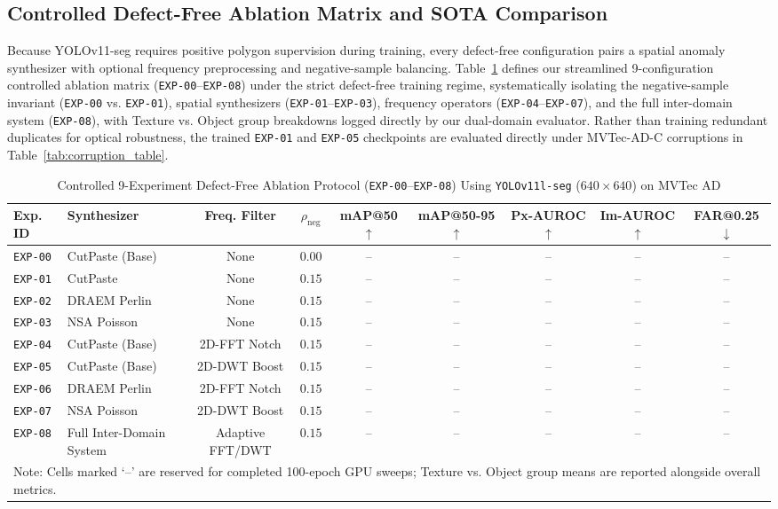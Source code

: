 \subsection{Controlled Defect-Free Ablation Matrix and SOTA Comparison}
Because YOLOv11-seg requires positive polygon supervision during training, every defect-free configuration pairs a spatial anomaly synthesizer with optional frequency preprocessing and negative-sample balancing. Table~\ref{tab:ablation_results} defines our streamlined 9-configuration controlled ablation matrix (\texttt{EXP-00}--\texttt{EXP-08}) under the strict defect-free training regime, systematically isolating the negative-sample invariant (\texttt{EXP-00} vs. \texttt{EXP-01}), spatial synthesizers (\texttt{EXP-01}--\texttt{EXP-03}), frequency operators (\texttt{EXP-04}--\texttt{EXP-07}), and the full inter-domain system (\texttt{EXP-08}), with Texture vs. Object group breakdowns logged directly by our dual-domain evaluator. Rather than training redundant duplicates for optical robustness, the trained \texttt{EXP-01} and \texttt{EXP-05} checkpoints are evaluated directly under MVTec-AD-C corruptions in Table~\ref{tab:corruption_table}.

\begin{table}[t]
\centering
\caption{Controlled 9-Experiment Defect-Free Ablation Protocol (\texttt{EXP-00}--\texttt{EXP-08}) Using \texttt{YOLOv11l-seg} ($640\times 640$) on MVTec AD}
\label{tab:ablation_results}
\setlength{\tabcolsep}{5pt}
\begin{tabular}{l l c c c c c c c}
\toprule
\textbf{Exp. ID} & \textbf{Synthesizer} & \textbf{Freq. Filter} & \textbf{$\rho_{\text{neg}}$} & \textbf{mAP@50} $\uparrow$ & \textbf{mAP@50-95} $\uparrow$ & \textbf{Px-AUROC} $\uparrow$ & \textbf{Im-AUROC} $\uparrow$ & \textbf{FAR@0.25} $\downarrow$ \\
\midrule
\texttt{EXP-00} & CutPaste (Base) & None & $0.00$ & -- & -- & -- & -- & -- \\
\texttt{EXP-01} & CutPaste & None & $0.15$ & -- & -- & -- & -- & -- \\
\texttt{EXP-02} & DRAEM Perlin & None & $0.15$ & -- & -- & -- & -- & -- \\
\texttt{EXP-03} & NSA Poisson & None & $0.15$ & -- & -- & -- & -- & -- \\
\texttt{EXP-04} & CutPaste (Base) & 2D-FFT Notch & $0.15$ & -- & -- & -- & -- & -- \\
\texttt{EXP-05} & CutPaste (Base) & 2D-DWT Boost & $0.15$ & -- & -- & -- & -- & -- \\
\texttt{EXP-06} & DRAEM Perlin & 2D-FFT Notch & $0.15$ & -- & -- & -- & -- & -- \\
\texttt{EXP-07} & NSA Poisson & 2D-DWT Boost & $0.15$ & -- & -- & -- & -- & -- \\
\texttt{EXP-08} & Full Inter-Domain System & Adaptive FFT/DWT & $0.15$ & -- & -- & -- & -- & -- \\
\bottomrule
\multicolumn{9}{l}{\footnotesize Note: Cells marked `--' are reserved for completed 100-epoch GPU sweeps; Texture vs. Object group means are reported alongside overall metrics.}
\end{tabular}
\end{table}

